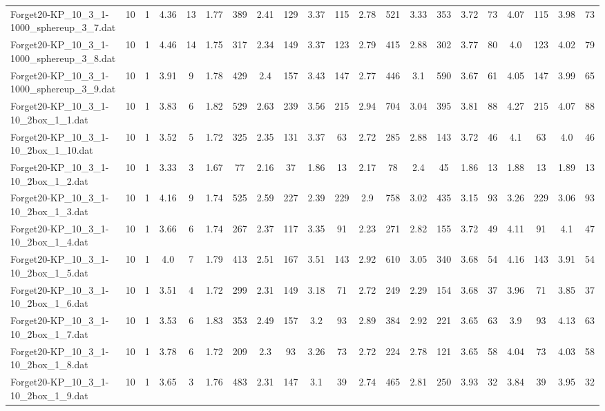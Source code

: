 \begin{sidewaystable}[!ht]
{\begin{tabular}{lcccccccccccccccccccc}
Forget20-KP\_10\_3\_1-1000\_sphereup\_3\_7.dat & 10 & 1 & 4.36 & 13 & 1.77 & 389 & 2.41 & 129 & 3.37 & 115 & 2.78 & 521 & 3.33 & 353 & 3.72 & 73 & 4.07 & 115 & 3.98 & 73 \\
Forget20-KP\_10\_3\_1-1000\_sphereup\_3\_8.dat & 10 & 1 & 4.46 & 14 & 1.75 & 317 & 2.34 & 149 & 3.37 & 123 & 2.79 & 415 & 2.88 & 302 & 3.77 & 80 & 4.0 & 123 & 4.02 & 79 \\
Forget20-KP\_10\_3\_1-1000\_sphereup\_3\_9.dat & 10 & 1 & 3.91 & 9 & 1.78 & 429 & 2.4 & 157 & 3.43 & 147 & 2.77 & 446 & 3.1 & 590 & 3.67 & 61 & 4.05 & 147 & 3.99 & 65 \\
Forget20-KP\_10\_3\_1-10\_2box\_1\_1.dat & 10 & 1 & 3.83 & 6 & 1.82 & 529 & 2.63 & 239 & 3.56 & 215 & 2.94 & 704 & 3.04 & 395 & 3.81 & 88 & 4.27 & 215 & 4.07 & 88 \\
Forget20-KP\_10\_3\_1-10\_2box\_1\_10.dat & 10 & 1 & 3.52 & 5 & 1.72 & 325 & 2.35 & 131 & 3.37 & 63 & 2.72 & 285 & 2.88 & 143 & 3.72 & 46 & 4.1 & 63 & 4.0 & 46 \\
Forget20-KP\_10\_3\_1-10\_2box\_1\_2.dat & 10 & 1 & 3.33 & 3 & 1.67 & 77 & 2.16 & 37 & 1.86 & 13 & 2.17 & 78 & 2.4 & 45 & 1.86 & 13 & 1.88 & 13 & 1.89 & 13 \\
Forget20-KP\_10\_3\_1-10\_2box\_1\_3.dat & 10 & 1 & 4.16 & 9 & 1.74 & 525 & 2.59 & 227 & 2.39 & 229 & 2.9 & 758 & 3.02 & 435 & 3.15 & 93 & 3.26 & 229 & 3.06 & 93 \\
Forget20-KP\_10\_3\_1-10\_2box\_1\_4.dat & 10 & 1 & 3.66 & 6 & 1.74 & 267 & 2.37 & 117 & 3.35 & 91 & 2.23 & 271 & 2.82 & 155 & 3.72 & 49 & 4.11 & 91 & 4.1 & 47 \\
Forget20-KP\_10\_3\_1-10\_2box\_1\_5.dat & 10 & 1 & 4.0 & 7 & 1.79 & 413 & 2.51 & 167 & 3.51 & 143 & 2.92 & 610 & 3.05 & 340 & 3.68 & 54 & 4.16 & 143 & 3.91 & 54 \\
Forget20-KP\_10\_3\_1-10\_2box\_1\_6.dat & 10 & 1 & 3.51 & 4 & 1.72 & 299 & 2.31 & 149 & 3.18 & 71 & 2.72 & 249 & 2.29 & 154 & 3.68 & 37 & 3.96 & 71 & 3.85 & 37 \\
Forget20-KP\_10\_3\_1-10\_2box\_1\_7.dat & 10 & 1 & 3.53 & 6 & 1.83 & 353 & 2.49 & 157 & 3.2 & 93 & 2.89 & 384 & 2.92 & 221 & 3.65 & 63 & 3.9 & 93 & 4.13 & 63 \\
Forget20-KP\_10\_3\_1-10\_2box\_1\_8.dat & 10 & 1 & 3.78 & 6 & 1.72 & 209 & 2.3 & 93 & 3.26 & 73 & 2.72 & 224 & 2.78 & 121 & 3.65 & 58 & 4.04 & 73 & 4.03 & 58 \\
Forget20-KP\_10\_3\_1-10\_2box\_1\_9.dat & 10 & 1 & 3.65 & 3 & 1.76 & 483 & 2.31 & 147 & 3.1 & 39 & 2.74 & 465 & 2.81 & 250 & 3.93 & 32 & 3.84 & 39 & 3.95 & 32 \\

\end{tabular}}
\end{sidewaystable}
